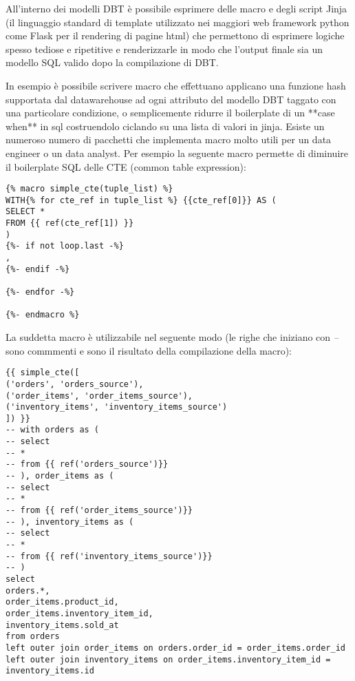 \documentclass[a4paper,12pt]{report}
\begin{document}
\noindent
All’interno dei modelli DBT è possibile esprimere delle macro e degli script Jinja (il linguaggio standard di template utilizzato nei maggiori web framework python come Flask per il rendering di pagine html) che permettono di esprimere logiche spesso tediose e ripetitive e renderizzarle in modo che l’output finale sia un modello SQL valido dopo la compilazione di DBT. 

\noindent
In esempio è possibile scrivere macro che effettuano applicano una funzione hash supportata dal datawarehouse ad ogni attributo del modello DBT taggato con una particolare condizione, o semplicemente ridurre il boilerplate di un **case when** in sql costruendolo ciclando su una lista di valori in jinja. Esiste un numeroso numero di pacchetti che implementa macro molto utili per un data engineer o un data analyst. Per esempio la seguente macro permette di diminuire il boilerplate SQL delle CTE (common table expression):

\begin{verbatim}
{% macro simple_cte(tuple_list) %}
WITH{% for cte_ref in tuple_list %} {{cte_ref[0]}} AS (
SELECT *
FROM {{ ref(cte_ref[1]) }}
)
{%- if not loop.last -%}
,
{%- endif -%}

{%- endfor -%}

{%- endmacro %}
\end{verbatim}

\noindent
La suddetta macro è utilizzabile nel seguente modo (le righe che iniziano con \emph{--} sono commmenti e sono il risultato della compilazione della macro):
\begin{verbatim}
{{ simple_cte([
('orders', 'orders_source'),
('order_items', 'order_items_source'),
('inventory_items', 'inventory_items_source')
]) }}
-- with orders as (
-- select
-- *
-- from {{ ref('orders_source')}}
-- ), order_items as (
-- select
-- *
-- from {{ ref('order_items_source')}}
-- ), inventory_items as (
-- select
-- *
-- from {{ ref('inventory_items_source')}}
-- )
select
orders.*,
order_items.product_id,
order_items.inventory_item_id,
inventory_items.sold_at
from orders
left outer join order_items on orders.order_id = order_items.order_id
left outer join inventory_items on order_items.inventory_item_id = inventory_items.id
\end{verbatim}
\end{document}

